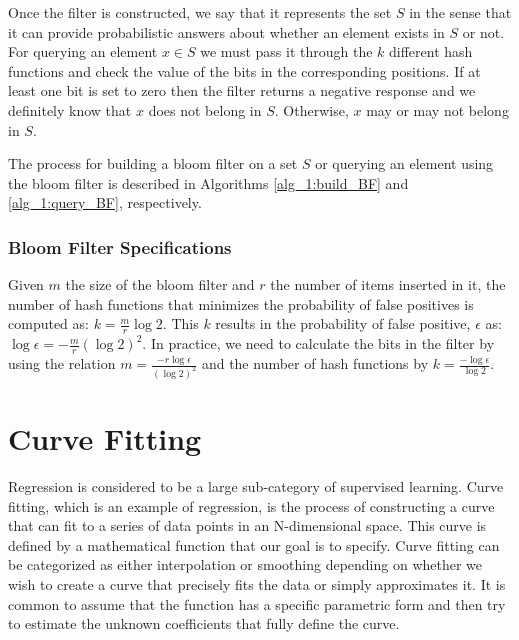         Once the filter is constructed, we say that it represents the set $S$ in the sense that it can provide probabilistic answers about whether an element exists in $S$ or not. For querying an element $x \in S$ we must pass it through the $k$ different hash functions and check the value of the bits in the corresponding positions. If at least one bit is set to zero then the filter returns a negative response and we definitely know that $x$ does not belong in $S$. 
        Otherwise, $x$ may or may not belong in $S$.

        The process for building a bloom filter on a set $S$ or querying an element using the bloom filter is described in Algorithms \ref{alg_1:build_BF} and \ref{alg_1:query_BF}, respectively.
        

    \subsubsection{Bloom Filter Specifications}

    \cite{5751342} Given $m$ the size of the bloom filter and $r$ the number of items inserted in it, the number of hash functions that minimizes the probability of false positives is computed as:
    $k=\frac{m}{r}\log 2.$ 
    This $k$ results in the probability of false positive, $\epsilon$ as: $\log\epsilon=-\frac{m}{r}(\log 2)^2.$ 
    In practice, we need to calculate the bits in the filter by using the relation $m=\frac{-r\log\epsilon}{(\log 2)^2}$ and the number of hash functions by $k=\frac{-\log\epsilon}{\log 2}$.

    \newpage

    \section{Curve Fitting}
    
    Regression is considered to be a large sub-category of supervised learning.
    Curve fitting, which is an example of regression, is the process of constructing a curve that can fit to a series of data points in an N-dimensional space.
    This curve is defined by a mathematical function that our goal is to specify.
    Curve fitting can be categorized as either interpolation  or smoothing depending on whether we wish to create a curve that precisely fits the data or simply approximates it.
    It is common to assume that the function has a specific parametric form 
    and then try to estimate the unknown coefficients that fully define the curve.
    
